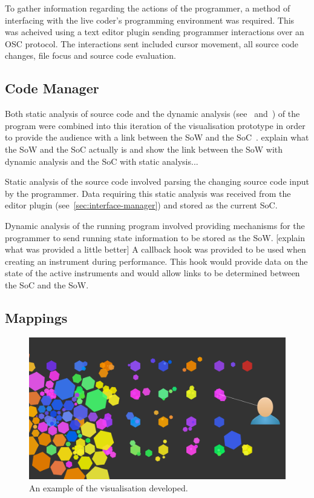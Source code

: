 To gather information regarding the actions of the programmer, a method of interfacing with the live coder's programming environment was required. This was acheived using a text editor plugin sending programmer interactions over an \ac{OSC} protocol. The interactions sent included cursor movement, all source code changes, file focus and source code evaluation.

\subsection{Code Manager}

Both static analysis of source code and the dynamic analysis (see~\cite{Eisenbarth2003} and~\cite{Jerding1997}) of the program were combined into this iteration of the visualisation prototype in order to provide the audience with a link between the \ac{SoW} and the \ac{SoC}~\cite{Swift2013}. {\color{red} explain what the \ac{SoW} and the \ac{SoC} actually is and show the link between the \ac{SoW} with dynamic analysis and the \ac{SoC} with static analysis...}

Static analysis of the source code involved parsing the changing source code input by the programmer. Data requiring this static analysis was received from the editor plugin (see~\ref{sec:interface-manager}) and stored as the current \ac{SoC}.

Dynamic analysis of the running program involved providing mechanisms for the programmer to send running state information to be stored as the \ac{SoW}. {\color{red} [explain what was provided a little better]} A callback hook was provided to be used when creating an instrument during performance. This hook would provide data on the state of the active instruments and would allow links to be determined between the \ac{SoC} and the \ac{SoW}.

\subsection{Mappings}

\begin{figure}
\centering
\includegraphics[width=\textwidth]{../images/final-visualisations/final-code-visualisation.png}
\caption[Prototype (second iteration) example]{An example of the visualisation developed.}
\label{fig:final-visualisation}
\end{figure}

